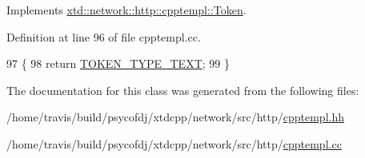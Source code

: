 Implements \hyperlink{classxtd_1_1network_1_1http_1_1cpptempl_1_1Token_afd7dd97138bbac2734e414a406a8e4fe}{xtd\-::network\-::http\-::cpptempl\-::\-Token}.



Definition at line 96 of file cpptempl.\-cc.


\begin{DoxyCode}
97 \{
98   \textcolor{keywordflow}{return} \hyperlink{namespacextd_1_1network_1_1http_1_1cpptempl_a39833083d228a5b5ef9f6bb7896479eeaa3056860c42c00806c737551b598885c}{TOKEN\_TYPE\_TEXT};
99 \}
\end{DoxyCode}


The documentation for this class was generated from the following files\-:\begin{DoxyCompactItemize}
\item 
/home/travis/build/psycofdj/xtdcpp/network/src/http/\hyperlink{cpptempl_8hh}{cpptempl.\-hh}\item 
/home/travis/build/psycofdj/xtdcpp/network/src/http/\hyperlink{cpptempl_8cc}{cpptempl.\-cc}\end{DoxyCompactItemize}
